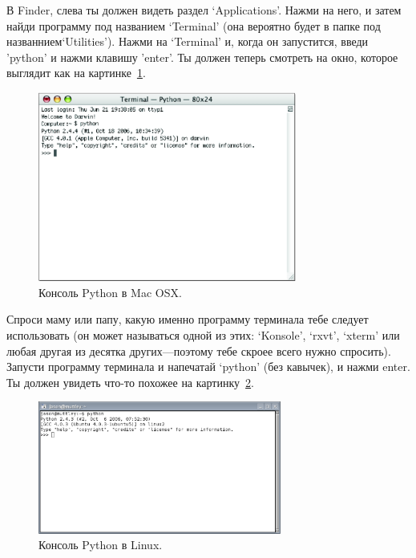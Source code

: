 \begin{MAC}
В Finder, слева ты должен видеть раздел `Applications'.  Нажми на него, и затем найди программу под названием `Terminal' (она вероятно будет в папке под названнием`Utilities').
Нажми на `Terminal' и, когда он запустится, введи 'python' и нажми клавишу 'enter'.  Ты должен теперь смотреть на окно, которое выглядит как на картинке~\ref{fig3}.

\begin{figure}
\begin{center}
\includegraphics[width=85mm]{figure3.eps}
\end{center}
\caption{Консоль Python в Mac OSX.}\label{fig3}
\end{figure}
\end{MAC}

\begin{LINUX}
Спроси маму или папу, какую именно программу терминала тебе следует использовать (он может называться одной из этих: `Konsole', `rxvt', `xterm' или любая другая из десятка других---поэтому тебе скроее всего нужно спросить).  Запусти программу терминала и напечатай `python' (без кавычек), и нажми enter.  Ты должен увидеть что-то похожее на картинку~\ref{fig4}.

\begin{figure}
\begin{center}
\includegraphics[width=80mm]{figure4.eps}
\end{center}
\caption{Консоль Python в Linux.}\label{fig4}
\end{figure}
\end{LINUX}

